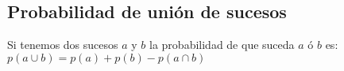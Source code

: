 \subsection{Probabilidad de unión de sucesos}
Si tenemos dos sucesos $a$ y $b$ la probabilidad de que suceda $a$ ó $b$ es:
$p(a\cup b)=p(a)+p(b)-p(a\cap b)$
